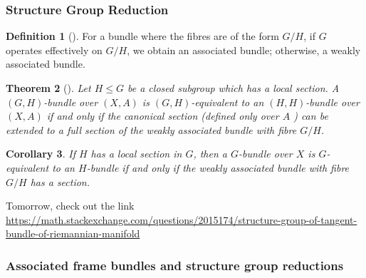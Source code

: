 \documentclass[reqno]{amsart}
\newtheorem{theorem}{Theorem}[section]
\newtheorem{corollary}[theorem]{Corollary}
\theoremstyle{definition}
\newtheorem{definition}[theorem]{Definition}
\theoremstyle{remark}
\begin{document}
    \subsubsection{Structure Group Reduction}


    \begin{definition}[]
        For a bundle where  the fibres are
        of the form $G /H$, if
        $G$ operates effectively on
        $G /H$, we obtain an associated bundle;
        otherwise, a weakly associated bundle.
    \end{definition}

    \begin{theorem}[]
        Let $H \le G$ be a closed subgroup which
        has a local section. 
        A $\left( G,H \right) $-bundle over
        $\left( X,A \right) $ is
        $(G,H)$-equivalent to an
        $\left( H,H \right) $-bundle over
        $\left( X,A \right) $ if and only if the 
        canonical section (defined only over $A$ ) can
        be extended to a full section of the
        weakly associated bundle with fibre
        $G /H$.
    \end{theorem}

    \begin{corollary}
        If $H$ has a local section in $G$, then
        a $G$-bundle over $X$ is $G$-equivalent to an
        $H$-bundle if and only if the weakly associated
        bundle with fibre $G /H$ has a section.
    \end{corollary}


    Tomorrow, check out the link
    \url{https://math.stackexchange.com/questions/2015174/structure-group-of-tangent-bundle-of-riemannian-manifold}

    \subsubsection{Associated frame bundles and structure
    group reductions}
\end{document}
